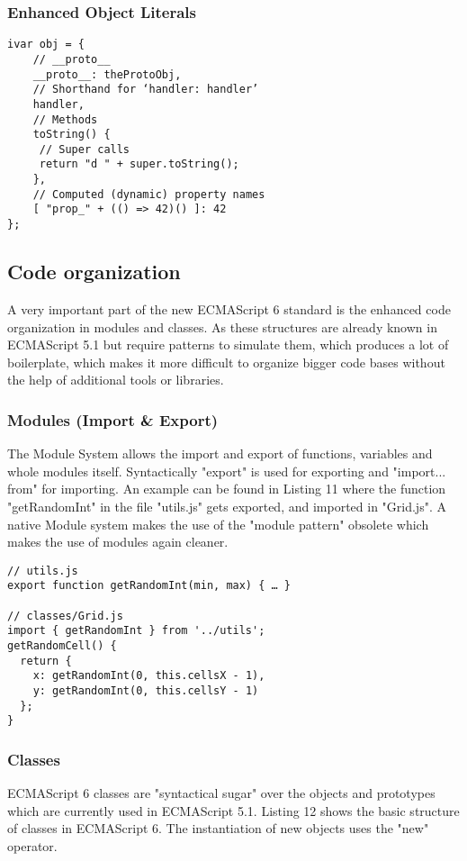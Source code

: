 \documentclass{bioinfo}
\begin{document}
\subsubsection{Enhanced Object Literals}

\begin{lstlisting}[caption= My Javascript Example]
ivar obj = {
    // __proto__
    __proto__: theProtoObj,
    // Shorthand for ‘handler: handler’
    handler,
    // Methods
    toString() {
     // Super calls
     return "d " + super.toString();
    },
    // Computed (dynamic) property names
    [ "prop_" + (() => 42)() ]: 42
};
\end{lstlisting}

\subsection{Code organization}
A very important part of the new ECMAScript 6 standard is the enhanced code organization in modules and classes. As these structures are already known
in ECMAScript 5.1 but require patterns to simulate them, which produces a lot of boilerplate, which makes it more difficult to organize bigger code bases
without the help of additional tools or libraries.
\subsubsection{Modules (Import \& Export)}
The Module System allows the import and export of functions, variables and whole modules itself. Syntactically "export" is used for exporting and "import... from"
for importing. An example can be found in Listing 11 where the function "getRandomInt" in the file "utils.js" gets exported, and imported in "Grid.js".
A native Module system makes the use of the "module pattern" obsolete which makes the use of modules again cleaner.

\begin{lstlisting}[caption= My Javascript Example]
// utils.js
export function getRandomInt(min, max) { … }

// classes/Grid.js
import { getRandomInt } from '../utils';
getRandomCell() {
  return {
    x: getRandomInt(0, this.cellsX - 1),
    y: getRandomInt(0, this.cellsY - 1)
  };
}
\end{lstlisting}

\subsubsection{Classes}
ECMAScript 6 classes are "syntactical sugar" over the objects and prototypes which are currently used in ECMAScript 5.1. 
Listing 12 shows the basic structure of classes in ECMAScript 6. The instantiation of new objects uses the "new" operator.
\end{document}
